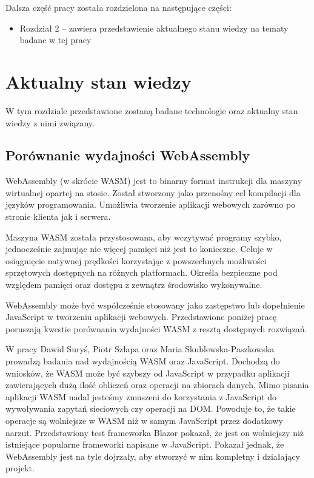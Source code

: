 \documentclass[language=polish,type=master]{aghmodern}
\begin{document}
Dalsza część pracy została rozdzielona na następujące części:

\begin{itemize}
    \item Rozdział 2 -- zawiera przedstawienie aktualnego stanu wiedzy na tematy badane w tej pracy
\end{itemize}

\chapter{Aktualny stan wiedzy}

W tym rozdziale przedstawione zostaną badane technologie oraz aktualny stan wiedzy z nimi związany.

\section{Porównanie wydajności WebAssembly}

WebAssembly (w skrócie WASM) jest to binarny format instrukcji dla maszyny wirtualnej opartej na stosie.
Został stworzony jako przenośny cel kompilacji dla języków programowania.
Umożliwia tworzenie aplikacji webowych zarówno po stronie klienta jak i serwera.

Maszyna WASM została przystosowana, aby wczytywać programy szybko, jednocześnie zajmując nie więcej pamięci niż jest to konieczne.
Celuje w osiągnięcie natywnej prędkości korzystając z powszechnych możliwości sprzętowych dostępnych na różnych platformach.
Określa bezpieczne pod względem pamięci oraz dostępu z zewnątrz środowisko wykonywalne.

WebAssembly może być współcześnie stosowany jako zastępstwo lub dopełnienie JavaScript w tworzeniu aplikacji webowych.
Przedstawione poniżej pracę poruszają kwestie porównania wydajności WASM z resztą dostępnych rozwiązań.

W pracy \cite{wasm_blazor} Dawid Suryś, Piotr Szłapa oraz Maria Skublewska-Paszkowska prowadzą badania nad wydajnością WASM oraz JavaScript.
Dochodzą do wniosków, że WASM może być szybszy od JavaScript w przypadku aplikacji zawierających dużą ilość obliczeń oraz operacji na zbiorach danych.
Mimo pisania aplikacji WASM nadal jesteśmy zmuszeni do korzystania z JavaScript do wywoływania zapytań sieciowych czy operacji na DOM.
Powoduje to, że takie operacje są wolniejsze w WASM niż w samym JavaScript przez dodatkowy narzut.
Przedstawiony test frameworka Blazor\footnotemark{} pokazał, że jest on wolniejszy niż istniejące popularne frameworki napisane w JavaScript.
Pokazał jednak, że WebAssembly jest na tyle dojrzały, aby stworzyć w nim kompletny i działający projekt.
\end{document}
